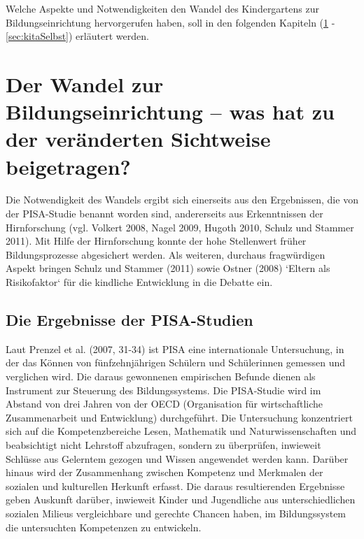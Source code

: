 Welche Aspekte und Notwendigkeiten den Wandel des Kindergartens zur Bildungseinrichtung hervorgerufen haben, soll in den folgenden Kapiteln (\ref{sec:kitaWandel} - \ref{sec:kitaSelbst}) erläutert werden. 

\section{Der Wandel zur Bildungseinrichtung – was hat zu der veränderten Sichtweise beigetragen?}\label{sec:kitaWandel}
Die Notwendigkeit des Wandels ergibt sich einerseits aus den Ergebnissen, die von der PISA-Studie benannt worden sind, andererseits aus Erkenntnissen der Hirnforschung (vgl. Volkert 2008, Nagel 2009, Hugoth 2010, Schulz und Stammer 2011). Mit Hilfe der Hirnforschung konnte der hohe Stellenwert früher Bildungsprozesse abgesichert werden. Als weiteren, durchaus fragwürdigen Aspekt bringen Schulz und Stammer (2011) sowie Ostner (2008) ‘Eltern als Risikofaktor‘ für die kindliche Entwicklung in die Debatte ein. 

\subsection{Die Ergebnisse der PISA-Studien}
Laut Prenzel et al. (2007, 31-34) ist PISA eine internationale Untersuchung, in der das Können von fünfzehnjährigen Schülern und Schülerinnen gemessen und verglichen wird. Die daraus gewonnenen empirischen Befunde dienen als Instrument zur Steuerung des Bildungssystems. Die PISA-Studie wird im Abstand von drei Jahren von der OECD (Organisation für wirtschaftliche Zusammenarbeit und Entwicklung) durchgeführt. Die Untersuchung konzentriert sich auf die Kompetenzbereiche Lesen, Mathematik und Naturwissenschaften und beabsichtigt nicht Lehrstoff abzufragen, sondern zu überprüfen, inwieweit Schlüsse aus Gelerntem gezogen und Wissen angewendet werden kann. Darüber hinaus wird der Zusammenhang zwischen Kompetenz und Merkmalen der sozialen und kulturellen Herkunft erfasst. Die daraus resultierenden Ergebnisse geben Auskunft darüber, inwieweit Kinder und Jugendliche aus unterschiedlichen sozialen Milieus vergleichbare und gerechte Chancen haben, im Bildungssystem die untersuchten Kompetenzen zu entwickeln. 

